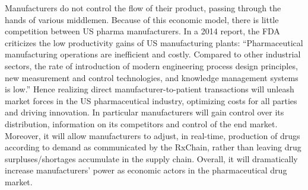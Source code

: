 Manufacturers do not control the flow of their product, passing through the hands of various middlemen.
Because of this economic model, there is little competition between US pharma manufacturers.
In a 2014 report, the FDA criticizes the low productivity gains of US manufacturing plants: “Pharmaceutical manufacturing operations are inefficient and costly. Compared to other industrial sectors, the rate of introduction of modern engineering process design principles, new measurement and control technologies, and knowledge management systems is low.” 
Hence realizing direct manufacturer-to-patient transactions will unleash market forces in the US pharmaceutical industry, optimizing costs for all parties and driving innovation.
In particular manufacturers will gain control over its distribution, information on its competitors and control of the end market. Moreover, it will allow manufacturers to adjust, in real-time, production of drugs according to demand as communicated by the RxChain, rather than leaving drug surpluses/shortages accumulate in the supply chain.
Overall, it will dramatically increase manufacturers’ power as economic actors in the pharmaceutical drug market.
